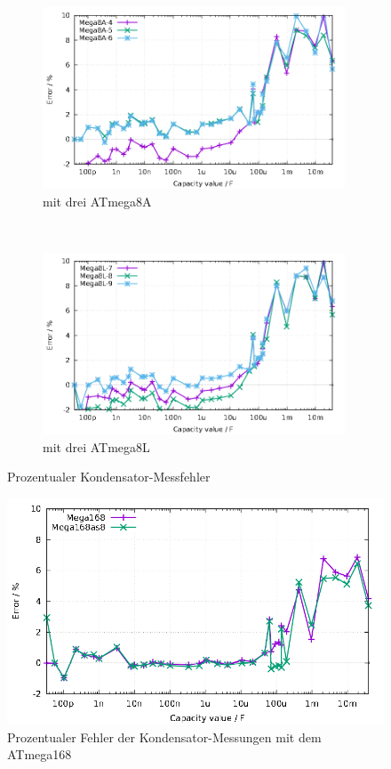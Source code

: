 \begin{figure}[H]
  \begin{subfigure}[b]{9cm}
    \centering
    \includegraphics[width=9cm]{../GNU/Mega8Acap.pdf}
    \caption{mit drei ATmega8A}
    \label{fig:mega8Acap}
  \end{subfigure}
  ~
  \begin{subfigure}[b]{9cm}
    \centering
    \includegraphics[width=9cm]{../GNU/Mega8Lcap.pdf}
    \caption{mit drei ATmega8L}
    \label{fig:mega8Lcap}
  \end{subfigure}
  \caption{Prozentualer Kondensator-Messfehler}
\end{figure}

\begin{figure}[H]
\centering
\includegraphics[width=18cm]{../GNU/Mega168cap.pdf}
\caption{Prozentualer Fehler der Kondensator-Messungen mit dem ATmega168}
\label{fig:mega168cap}
\end{figure}

